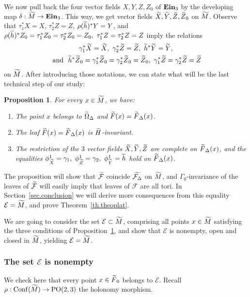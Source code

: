 \documentclass[11pt]{article}
\newtheorem{prop}[theo]{Proposition}
\theoremstyle{definition}
\numberwithin{equation}{section}
\numberwithin{figure}{section}
\numberwithin{table}{section}
\DeclareMathOperator{\Conf}{Conf}
\DeclareMathOperator{\ein}{{\bf Ein}_3}
\newcommand{\calf}{\mathcal{F}}
\newcommand{\tm}{\tilde{{M}}}
\newcommand{\tX}{\tilde{{X}}}
\newcommand{\tY}{\tilde{{Y}}}
\newcommand{\tZ}{\tilde{{Z}}}
\newcommand{\tcalf}{\tilde{{\mathcal{F}}}}
\newcommand{\tF}{\tilde{{F}}}
\newcommand{\tth}{\tilde{h}}
\newcommand{\tcalfd}{\tilde{{\mathcal{F}_{\Delta}}}}
\DeclareMathOperator{\POop}{PO}
\newcommand{\PO}{{\POop(2,3)}}
\let\oldtilde\tilde
\renewcommand*\tilde[1]{\mathchoice{\widetilde{#1}}{\widetilde{#1}}{\widetilde{#1}}{\oldtilde{#1}}}
\begin{document}
We now pull back the four vector fields $X,Y,Z,Z_0$ of $\ein$ by the developing map $\delta: \tm \to \ein$. This way, we get vector fields $\tX,\tY, \tZ, \tZ_0$ on $\tm$. Observe that $\tau_1^*X=X$, $\tau_2^*Z=Z$, $\rho(\tth)^*Y=Y$, and $\rho(\tth)^*Z_0=\tau_1^*Z_0=\tau_2^*Z_0=Z_0, \ \tau_1^*Z=\tau_2^*Z=Z$ imply the relations
\begin{multline}\label{eq.vectorfields}
\gamma_1^*\tX=\tX,\ \gamma_2^*\tZ=\tZ, \ \tth^*\tY=\tY,\\
\text{ and }\ \tth^*\tZ_0=\gamma_1^*\tZ_0= \gamma_2^*\tZ_0=\tZ_0, \ \gamma_1^*\tZ= \gamma_2^*\tZ=\tZ
\end{multline}
on $\tm$. After introducing those notations, we can state what will be the last technical step of our study:

\begin{prop}\label{prop.ensembleE}
For every $x \in \tm$, we have:
\begin{enumerate}
\item \label{list8.17.1}The point $x$ belongs to $\tilde{\Omega}_{\Delta}$ and $\tilde{F}(x)=\tilde{F}_{\Delta}(x)$.
\item \label{list8.17.2}The leaf $\tilde{F}(x)=\tilde{F}_{\Delta}(x)$ is $\tilde{H}$-invariant.
\item \label{list8.17.3}The restriction of the $3$ vector fields $\tX,\tY,\tZ$ are complete on $\tilde{F}_{\Delta}(x)$, and the equalities $\phi_{\tilde{X}}^1=\gamma_1, \ \phi_{\tilde{Z}}^1=\gamma_2, \ \phi_{\tilde{Y}}^1=\tilde{h}$ hold on $\tilde{F}_{\Delta}(x)$.
\end{enumerate}
\end{prop}

The proposition will show that $\tcalf$ coincide $\tcalfd$ on $\tm$, and $\Gamma_{0}$-invariance of the leaves of $\tcalf$ will easily imply that leaves of $\calf$ are all tori. In Section~\ref{sec.conclusion} we will derive more consequences from this equality ${\mathcal E}=\tm$, and prove Theorem~\ref{th.theoplat}.

We are going to consider the set $\mathcal{E} \subset \tm$, comprising all points $x \in \tm$ satisfying the three conditions of Proposition~\ref{prop.ensembleE}, and show that $\mathcal{E}$ is nonempty, open and closed in $\tm$, yielding $\mathcal{E}=\tm$.



\subsubsection{The set \texorpdfstring{$\mathcal{E}$}{E} is nonempty}\label{sec.nonempty}
We check here that every point $x \in \tF_0$ belongs to $\mathcal{E}$. Recall $\rho: \Conf(\tm) \to \PO$ the holonomy morphism.
\end{document}
